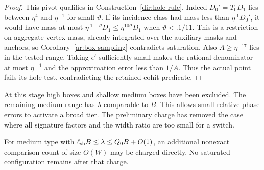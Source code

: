 \begin{proof}
This pivot qualifies in Construction~\ref{dir:hole-rule}.
Indeed $D_0'=T_0D_1$ lies between $\eta^4$ and $\eta^{-1}$ for small
$\vartheta$. If its incidence class had mass less than
$\eta^{.1}D_0'$, it would have mass at most
$\eta^{.1-\vartheta}D_1\le\eta^{10\vartheta}D_1$ when
$\vartheta<.1/11$. This is a restriction on aggregate vertex mass,
already integrated over the auxiliary masks and anchors, so
Corollary~\ref{ar:box-sampling} contradicts saturation. Also
$A\ge\eta^{-17}$ lies in the tested
range. Taking $\epsilon'$ sufficiently small makes the rational
denominator at most $\eta^{-.1}$ and the approximation error less
than $1/A$. Thus the actual point fails its hole test, contradicting
the retained cohit predicate.
\end{proof}

At this stage high boxes and shallow medium boxes have been excluded.
The remaining medium range has $\lambda$ comparable to $B$. This
allows small relative phase errors to activate a broad tier. The
preliminary charge has removed the case where all signature factors
and the width ratio are too small for a switch.

\begin{lemma}\label{dir:deep-box}
For medium type with
$\ell_{\rm sh}B\le\lambda\le Q_0B+O(1)$, an additional nonexact
comparison count of size $O(W)$ may be charged directly. No
saturated configuration remains after that charge.
\end{lemma}

